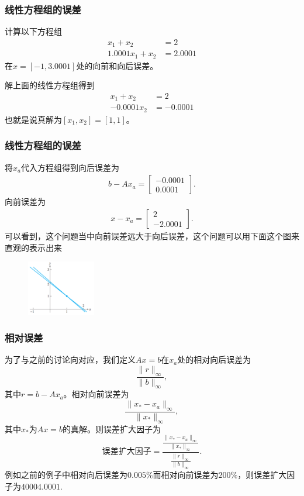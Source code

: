 \documentclass[10pt]{beamer}
\begin{document}
\begin{frame}
\frametitle{线性方程组的误差}
\begin{example}
计算以下方程组
\begin{align}
x_1 + x_2 &= 2 \nonumber \\
1.0001x_1 + x_2 &= 2.0001
\end{align}
在$x = [-1, 3.0001]$处的向前和向后误差。
\end{example}
解上面的线性方程组得到
\begin{align}
x_1 + x_2 &= 2 \nonumber \\
-0.0001 x_2 &= -0.0001
\end{align}
也就是说真解为$[x_1, x_2] = [1,1]$。
\end{frame}


\begin{frame}
\frametitle{线性方程组的误差}
将$x_a$代入方程组得到向后误差为
\begin{align}
b - Ax_a = \left[ \begin{array}{c}
    -0.0001 \\ 0.0001  \end{array} \right].
\end{align}
向前误差为
\begin{align}
x - x_a = \left[ \begin{array}{c}
    2 \\ -2.0001  \end{array} \right].
\end{align}
可以看到，这个问题当中向前误差远大于向后误差，这个问题可以用下面这个图来直观的表示出来
\begin{figure}
\includegraphics[width=3cm]{figs/2-3-1_Condition_Number-1} 
\end{figure}
\end{frame}


\begin{frame}
\frametitle{相对误差}
为了与之前的讨论向对应，我们定义$Ax = b$在$x_a$处的相对向后误差为
\begin{equation}
\frac{\|r\|_{\infty}}{\|b\|_{\infty}},
\end{equation}
其中$r = b - Ax_a$。相对向前误差为
\begin{equation}
\frac{\|x_*-x_a\|_{\infty}}{\|x_*\|_{\infty}},
\end{equation}
其中$x_*$为$Ax = b$的真解。则误差扩大因子为
\begin{equation}
\text{误差扩大因子} = \frac{\frac{\|x_*-x_a\|_{\infty}}{\|x_*\|_{\infty}}}{\frac{\|r\|_{\infty}}{\|b\|_{\infty}}}.
\end{equation}
例如之前的例子中相对向后误差为$0.005\%$而相对向前误差为$200\%$，则误差扩大因子为$40004.0001$.
\end{frame}
\end{document}
